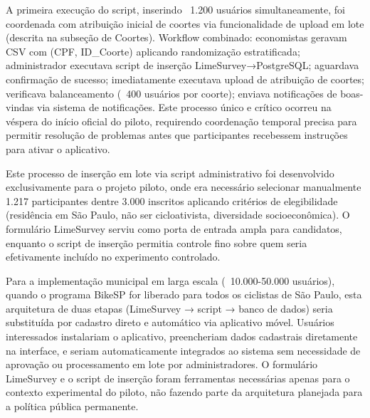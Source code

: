 A primeira execução do script, inserindo ~1.200 usuários simultaneamente, foi coordenada com atribuição inicial de coortes via funcionalidade de upload em lote (descrita na subseção de Coortes). Workflow combinado: economistas geravam CSV com (CPF, ID\_Coorte) aplicando randomização estratificada; administrador executava script de inserção LimeSurvey→PostgreSQL; aguardava confirmação de sucesso; imediatamente executava upload de atribuição de coortes; verificava balanceamento (~400 usuários por coorte); enviava notificações de boas-vindas via sistema de notificações. Este processo único e crítico ocorreu na véspera do início oficial do piloto, requirendo coordenação temporal precisa para permitir resolução de problemas antes que participantes recebessem instruções para ativar o aplicativo.

Este processo de inserção em lote via script administrativo foi desenvolvido exclusivamente para o projeto piloto, onde era necessário selecionar manualmente 1.217 participantes dentre 3.000 inscritos aplicando critérios de elegibilidade (residência em São Paulo, não ser cicloativista, diversidade socioeconômica). O formulário LimeSurvey serviu como porta de entrada ampla para candidatos, enquanto o script de inserção permitia controle fino sobre quem seria efetivamente incluído no experimento controlado.

Para a implementação municipal em larga escala (~10.000-50.000 usuários), quando o programa BikeSP for liberado para todos os ciclistas de São Paulo, esta arquitetura de duas etapas (LimeSurvey → script → banco de dados) seria substituída por cadastro direto e automático via aplicativo móvel. Usuários interessados instalariam o aplicativo, preencheriam dados cadastrais diretamente na interface, e seriam automaticamente integrados ao sistema sem necessidade de aprovação ou processamento em lote por administradores. O formulário LimeSurvey e o script de inserção foram ferramentas necessárias apenas para o contexto experimental do piloto, não fazendo parte da arquitetura planejada para a política pública permanente.


